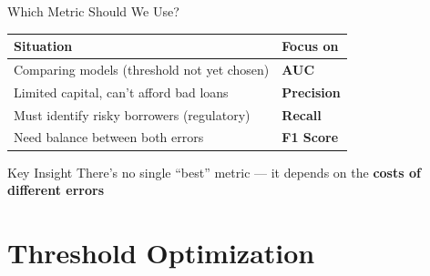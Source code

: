 \documentclass[10pt]{beamer}
\newcommand{\highlight}[1]{\textcolor{AccentOrange}{\textbf{#1}}}
\begin{document}

\begin{frame}{Which Metric Should We Use?}

  \begin{center}
  \begin{tabular}{ll}
    \toprule
    \textbf{Situation} & \textbf{Focus on} \\
    \midrule
    Comparing models (threshold not yet chosen) & \textbf{AUC} \\
    \addlinespace
    Limited capital, can't afford bad loans & \textbf{Precision} \\
    \addlinespace
    Must identify risky borrowers (regulatory) & \textbf{Recall} \\
    \addlinespace
    Need balance between both errors & \textbf{F1 Score} \\
    \bottomrule
  \end{tabular}
  \end{center}

  \vspace{1em}
  \begin{block}{Key Insight}
    There's no single ``best'' metric --- it depends on the \highlight{costs of different errors}
  \end{block}
\end{frame}

\section{Threshold Optimization}
\end{document}
